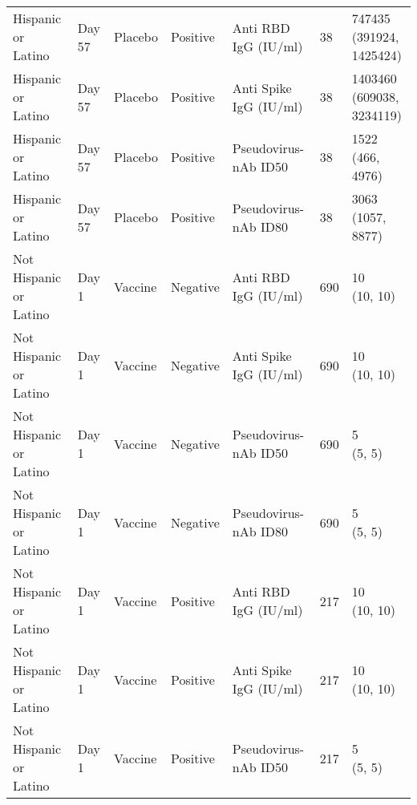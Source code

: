 \documentclass[]{book}
\theoremstyle{definition}
\theoremstyle{definition}
\theoremstyle{definition}
\newcommand{\1}{\mathbbm{1}}
\begin{document}
\begin{landscape}
\begin{ThreePartTable}
\begin{longtable}[t]{>{\raggedright\arraybackslash}p{7cm}llllll}
\hspace{1em}Hispanic or Latino & Day 57 & Placebo & Positive & Anti RBD IgG (IU/ml) & 38 & \makecell[l]{747435\\(391924, 1425424)}\\
\hspace{1em}Hispanic or Latino & Day 57 & Placebo & Positive & Anti Spike IgG (IU/ml) & 38 & \makecell[l]{1403460\\(609038, 3234119)}\\
\hspace{1em}Hispanic or Latino & Day 57 & Placebo & Positive & Pseudovirus-nAb ID50 & 38 & \makecell[l]{1522\\(466, 4976)}\\
\hspace{1em}Hispanic or Latino & Day 57 & Placebo & Positive & Pseudovirus-nAb ID80 & 38 & \makecell[l]{3063\\(1057, 8877)}\\
\hspace{1em}Not Hispanic or Latino & Day 1 & Vaccine & Negative & Anti RBD IgG (IU/ml) & 690 & \makecell[l]{10\\(10, 10)}\\
\hspace{1em}Not Hispanic or Latino & Day 1 & Vaccine & Negative & Anti Spike IgG (IU/ml) & 690 & \makecell[l]{10\\(10, 10)}\\
\hspace{1em}Not Hispanic or Latino & Day 1 & Vaccine & Negative & Pseudovirus-nAb ID50 & 690 & \makecell[l]{5\\(5, 5)}\\
\hspace{1em}Not Hispanic or Latino & Day 1 & Vaccine & Negative & Pseudovirus-nAb ID80 & 690 & \makecell[l]{5\\(5, 5)}\\
\hspace{1em}Not Hispanic or Latino & Day 1 & Vaccine & Positive & Anti RBD IgG (IU/ml) & 217 & \makecell[l]{10\\(10, 10)}\\
\hspace{1em}Not Hispanic or Latino & Day 1 & Vaccine & Positive & Anti Spike IgG (IU/ml) & 217 & \makecell[l]{10\\(10, 10)}\\
\hspace{1em}Not Hispanic or Latino & Day 1 & Vaccine & Positive & Pseudovirus-nAb ID50 & 217 & \makecell[l]{5\\(5, 5)}\\

\end{longtable}
\end{ThreePartTable}
\end{landscape}
\end{document}
